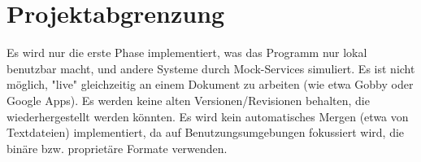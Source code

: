 
\section{Projektabgrenzung}
Es wird nur die erste Phase implementiert, was das Programm nur lokal benutzbar macht, und andere Systeme durch Mock-Services simuliert. 
Es ist nicht möglich, "live" gleichzeitig an einem Dokument zu arbeiten (wie etwa Gobby oder Google Apps).
Es werden keine alten Versionen/Revisionen behalten, die wiederhergestellt werden könnten.
Es wird kein automatisches Mergen (etwa von Textdateien) implementiert, da auf Benutzungsumgebungen fokussiert wird, die binäre bzw. proprietäre Formate verwenden.